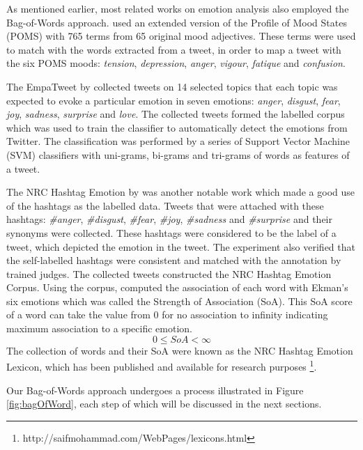 As mentioned earlier, most related works on emotion analysis also employed the Bag-of-Words approach. \citet{bollen2009modeling} used an extended version of the Profile of Mood States (POMS) with 765 terms from 65 original mood adjectives. These terms were used to match with the words extracted from a tweet, in order to map a tweet with the six POMS moods: \textit{tension}, \textit{depression}, \textit{anger}, \textit{vigour}, \textit{fatique} and \textit{confusion}.

The EmpaTweet by \citet{roberts2012empatweet} collected tweets on 14 selected topics that each topic was expected to evoke a particular emotion in seven emotions: \textit{anger}, \textit{disgust}, \textit{fear}, \textit{joy}, \textit{sadness}, \textit{surprise} and \textit{love}. The collected tweets formed the labelled corpus which was used to train the classifier to automatically detect the emotions from Twitter. The classification was performed by a series of Support Vector Machine (SVM) classifiers with uni-grams, bi-grams and tri-grams of words as features of a tweet.

The NRC Hashtag Emotion by \citet{mohammad2014using} was another notable work which made a good use of the hashtags as the labelled data. Tweets that were attached with these hashtags: \textit{\#anger}, \textit{\#disgust}, \textit{\#fear}, \textit{\#joy}, \textit{\#sadness} and \textit{\#surprise} and their synonyms were collected. These hashtags were considered to be the label of a tweet, which depicted the emotion in the tweet. The experiment also verified that the self-labelled hashtags were consistent and matched with the annotation by trained judges. The collected tweets constructed the NRC Hashtag Emotion Corpus. Using the corpus, \citet{mohammad2014using} computed the association of each word with Ekman's six emotions which was called the Strength of Association (SoA). This SoA score of a word can take the value from 0 for no association to infinity indicating maximum association to a specific emotion.
\begin{equation}
	0 \leq SoA < \infty
\end{equation}
The collection of words and their SoA were known as the NRC Hashtag Emotion Lexicon, which has been published and available for research purposes \footnote{http://saifmohammad.com/WebPages/lexicons.html}. 

Our Bag-of-Words approach undergoes a process illustrated in Figure \ref{fig:bagOfWord}, each step of which will be discussed in the next sections.

